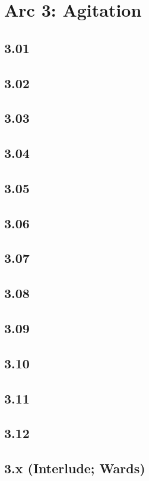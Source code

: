 \part{Arc 3: Agitation}
 \chapter{3.01}
 \chapter{3.02}
 \chapter{3.03}
 \chapter{3.04}
 \chapter{3.05}
 \chapter{3.06}
 \chapter{3.07}
 \chapter{3.08}
 \chapter{3.09}
 \chapter{3.10}
 \chapter{3.11}
 \chapter{3.12}
 \chapter{3.x (Interlude; Wards)}














